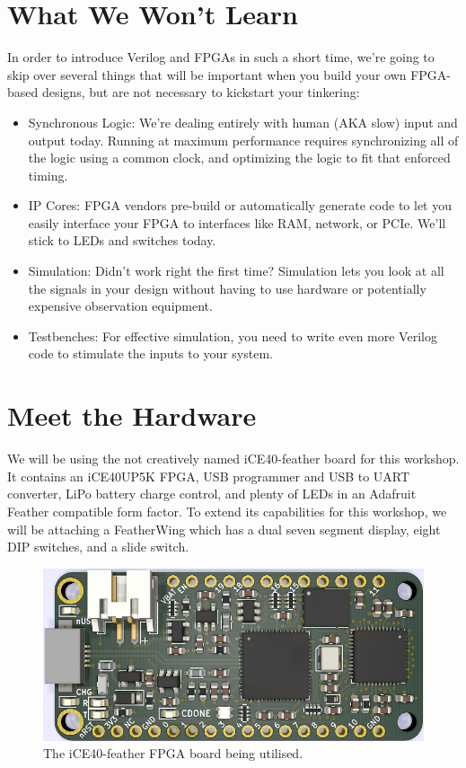 \documentclass[12pt,a4paper]{article}
\begin{document}
\section{What We Won't Learn}
In order to introduce Verilog and FPGAs in such a short time, we’re going to skip over several things that will be important when you build your own FPGA-based designs, but are not necessary to kickstart your tinkering: 
\begin{itemize}
	\item Synchronous Logic: We’re dealing entirely with human (AKA slow) input and output today. Running at maximum performance requires synchronizing all of the logic using a common clock, and optimizing the logic to fit that enforced timing.
	\item IP Cores: FPGA vendors pre-build or automatically generate code to let you easily interface your FPGA to interfaces like RAM, network, or PCIe. We’ll stick to LEDs and switches today.
	\item Simulation: Didn’t work right the first time? Simulation lets you look at all the signals in your design without having to use hardware or potentially expensive observation equipment.
	\item Testbenches: For effective simulation, you need to write even more Verilog code to stimulate the inputs to your system.
\end{itemize}

\newpage
\section{Meet the Hardware}
We will be using the not creatively named iCE40-feather board for this workshop. It contains an iCE40UP5K FPGA, USB programmer and USB to UART converter, LiPo battery charge control, and plenty of LEDs in an Adafruit Feather compatible form factor. To extend its capabilities for this workshop, we will be attaching a FeatherWing which has a dual seven segment display, eight DIP switches, and a slide switch. 

\begin{figure}[H]
\begin{centering}
	\includegraphics[width=\linewidth]{top_render.PNG}
	\caption{The iCE40-feather FPGA board being utilised.}
\end{centering}
\end{figure}
\end{document}
